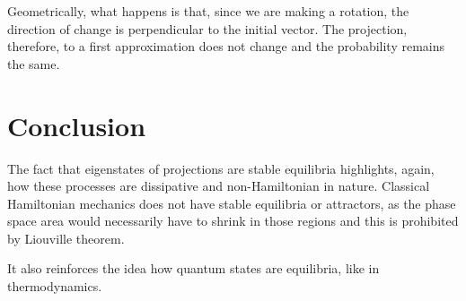 \documentclass[aps,pra,10pt,floatfix,nofootinbib]{revtex4-2}
\theoremstyle{definition}
\begin{document}
Geometrically, what happens is that, since we are making a rotation, the direction of change is perpendicular to the initial vector. The projection, therefore, to a first approximation does not change and the probability remains the same.

\section{Conclusion}

The fact that eigenstates of projections are stable equilibria highlights, again, how these processes are dissipative and non-Hamiltonian in nature. Classical Hamiltonian mechanics does not have stable equilibria or attractors, as the phase space area would necessarily have to shrink in those regions and this is prohibited by Liouville theorem.

It also reinforces the idea how quantum states are equilibria, like in thermodynamics.
\end{document}
